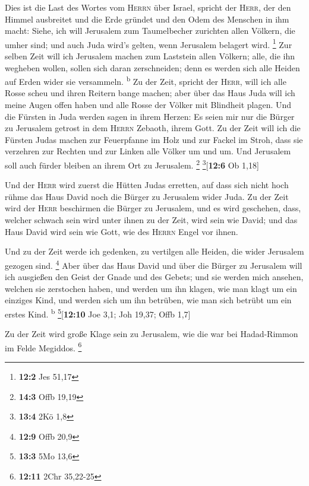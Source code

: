  Dies ist die Last des Wortes vom \textsc{Herrn} über
Israel, spricht der \textsc{Herr}, der den Himmel ausbreitet und die
Erde gründet und den Odem des Menschen in ihm macht: 
Siehe, ich will Jerusalem zum Taumelbecher zurichten allen Völkern, die
umher sind; und auch Juda wird's gelten, wenn Jerusalem belagert wird.
\footnote{\textbf{12:2} Jes 51,17}  Zur selben Zeit will
ich Jerusalem machen zum Laststein allen Völkern; alle, die ihn wegheben
wollen, sollen sich daran zerschneiden; denn es werden sich alle Heiden
auf Erden wider sie versammeln. \textsuperscript{b}  Zu
der Zeit, spricht der \textsc{Herr}, will ich alle Rosse scheu und ihren
Reitern bange machen; aber über das Haus Juda will ich meine Augen offen
haben und alle Rosse der Völker mit Blindheit plagen.  Und
die Fürsten in Juda werden sagen in ihrem Herzen: Es seien mir nur die
Bürger zu Jerusalem getrost in dem \textsc{Herrn} Zebaoth, ihrem Gott.
 Zu der Zeit will ich die Fürsten Judas machen zur
Feuerpfanne im Holz und zur Fackel im Stroh, dass sie verzehren zur
Rechten und zur Linken alle Völker um und um. Und Jerusalem soll auch
fürder bleiben an ihrem Ort zu Jerusalem. \footnote{\textbf{14:3} Offb
  19,19} \footnote{\textbf{13:4} 2Kö 1,8}{[}\textbf{12:6} Ob 1,18{]}

 Und der \textsc{Herr} wird zuerst die Hütten Judas
erretten, auf dass sich nicht hoch rühme das Haus David noch die Bürger
zu Jerusalem wider Juda.  Zu der Zeit wird der
\textsc{Herr} beschirmen die Bürger zu Jerusalem, und es wird geschehen,
dass, welcher schwach sein wird unter ihnen zu der Zeit, wird sein wie
David; und das Haus David wird sein wie Gott, wie des \textsc{Herrn}
Engel vor ihnen.

 Und zu der Zeit werde ich gedenken, zu vertilgen alle
Heiden, die wider Jerusalem gezogen sind. \footnote{\textbf{12:9} Offb
  20,9}  Aber über das Haus David und über die Bürger zu
Jerusalem will ich ausgießen den Geist der Gnade und des Gebets; und sie
werden mich ansehen, welchen sie zerstochen haben, und werden um ihn
klagen, wie man klagt um ein einziges Kind, und werden sich um ihn
betrüben, wie man sich betrübt um ein erstes Kind. \textsuperscript{b}
\footnote{\textbf{13:3} 5Mo 13,6}{[}\textbf{12:10} Joe 3,1; Joh 19,37;
Offb 1,7{]}

 Zu der Zeit wird große Klage sein zu Jerusalem, wie die
war bei Hadad-Rimmon im Felde Megiddos. \footnote{\textbf{12:11} 2Chr
  35,22-25}

